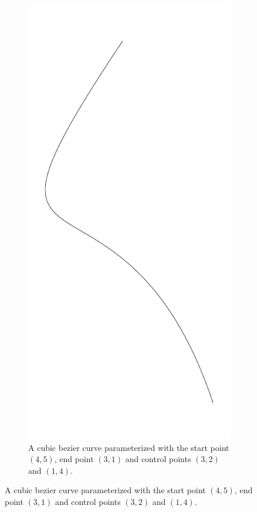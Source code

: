 \begin{figure}
    \centering
    \begin{subfigure}{.45\textwidth}
        \includegraphics[height=.3\textheight]{graphics/curve_a.pdf}
        \caption{A cubic bezier curve parameterized with the start point $(4,5)$, end point $(3,1)$ and control points $(3,2)$ and $(1,4)$.}
    \end{subfigure}

\end{figure}

